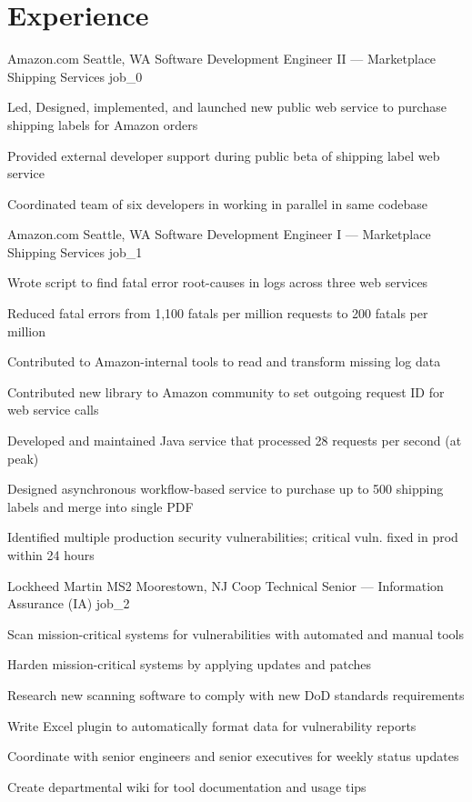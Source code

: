 \documentclass[10pt]{barag_resume}
\author{Sean Barag}
\begin{document}
\section{Experience}\relax
    \renewcommand{\labelitemi}{$\cdot$}\relax %
    \begin{job}{Amazon.com}
        {Seattle, WA}
        {Software Development Engineer II --- Marketplace Shipping Services}
        {job_0}
            \item Led, Designed, implemented, and launched new public web service to purchase shipping labels for Amazon orders
            \item Provided external developer support during public beta of shipping label web service
            \item Coordinated team of six developers in working in parallel in same codebase
    \end{job}

    \begin{job}{Amazon.com}
        {Seattle, WA}
        {Software Development Engineer I --- Marketplace Shipping Services}
        {job_1}
            \item Wrote script to find fatal error root-causes in logs across three web services
            \item Reduced fatal errors from 1,100 fatals per million requests to 200 fatals per million
            \item Contributed to Amazon-internal tools to read and transform missing log data
            \item Contributed new library to Amazon community to set outgoing request ID for web service calls
            \item Developed and maintained Java service that processed 28 requests per second (at peak)
            \item Designed asynchronous workflow-based service to purchase up to 500 shipping labels and merge into single PDF
            \item Identified multiple production security vulnerabilities; critical vuln. fixed in prod within 24 hours
    \end{job}

    \begin{job}{Lockheed Martin MS2}
        {Moorestown, NJ}
        {Coop Technical Senior --- Information Assurance (IA)}
        {job_2}
            \item Scan mission-critical systems for vulnerabilities with automated and manual tools
            \item Harden mission-critical systems by applying updates and patches
            \item Research new scanning software to comply with new DoD standards requirements
            \item Write Excel plugin to automatically format data for vulnerability reports
            \item Coordinate with senior engineers and senior executives for weekly status updates
            \item Create departmental wiki for tool documentation and usage tips
    \end{job}
\end{document}
